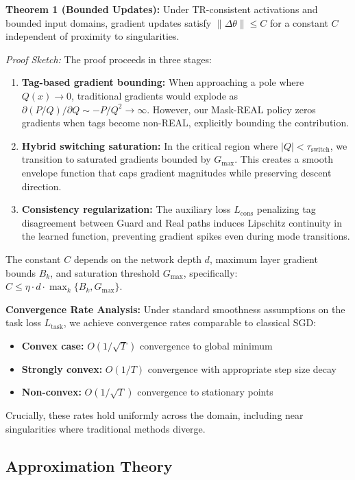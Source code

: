 \documentclass[twoside,11pt]{article}
\begin{document}
\textbf{Theorem 1 (Bounded Updates):} Under TR-consistent activations and bounded input domains, gradient updates satisfy $\|\Delta\theta\| \leq C$ for a constant $C$ independent of proximity to singularities.

\emph{Proof Sketch:} The proof proceeds in three stages:
\begin{enumerate}
\item \textbf{Tag-based gradient bounding:} When approaching a pole where $Q(x) \to 0$, traditional gradients would explode as $\partial(P/Q)/\partial Q \sim -P/Q^2 \to \infty$. However, our Mask-REAL policy zeros gradients when tags become non-REAL, explicitly bounding the contribution.
\item \textbf{Hybrid switching saturation:} In the critical region where $|Q| < \tau_{\text{switch}}$, we transition to saturated gradients bounded by $G_{\max}$. This creates a smooth envelope function that caps gradient magnitudes while preserving descent direction.
\item \textbf{Consistency regularization:} The auxiliary loss $L_{\text{cons}}$ penalizing tag disagreement between Guard and Real paths induces Lipschitz continuity in the learned function, preventing gradient spikes even during mode transitions.
\end{enumerate}

The constant $C$ depends on the network depth $d$, maximum layer gradient bounds $B_k$, and saturation threshold $G_{\max}$, specifically: $C \leq \eta \cdot d \cdot \max_k\{B_k, G_{\max}\}$.

\textbf{Convergence Rate Analysis:}
Under standard smoothness assumptions on the task loss $L_{\text{task}}$, we achieve convergence rates comparable to classical SGD:
\begin{itemize}
\item \textbf{Convex case:} $O(1/\sqrt{T})$ convergence to global minimum
\item \textbf{Strongly convex:} $O(1/T)$ convergence with appropriate step size decay
\item \textbf{Non-convex:} $O(1/\sqrt{T})$ convergence to stationary points
\end{itemize}

Crucially, these rates hold uniformly across the domain, including near singularities where traditional methods diverge.
\subsection{Approximation Theory}
\end{document}

